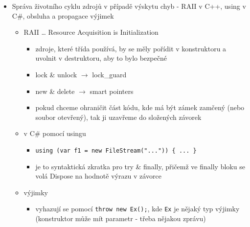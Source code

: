 \begin{itemize}
\begin{itemize}
\item můžou být statické
\begin{itemize}
\item např. \texttt{static \allowbreak{}x \allowbreak{}=\textgreater{}\allowbreak{} \allowbreak{}x \allowbreak{}+ \allowbreak{}1}
\end{itemize}
\item pokud nejsou statické, můžou zachytávat proměnné z kontextu (provádí se zachycení podobné capture by reference v C++)
\item lambda funkce jsou přiřaditelné do proměnných typu delegát
\end{itemize}
\item Správa životního cyklu zdrojů v případě výskytu chyb - RAII v C++, using v C\#, obsluha a propagace výjimek
\begin{itemize}
\item RAII \dots{} Resource Acquisition is Initialization
\begin{itemize}
\item zdroje, které třída používá, by se měly pořídit v konstruktoru a uvolnit v destruktoru, aby to bylo bezpečné
\item lock \& unlock $\to$ lock\_guard
\item new \& delete $\to$ smart pointers
\item pokud chceme ohraničit část kódu, kde má být zámek zamčený (nebo soubor otevřený), tak ji uzavřeme do složených závorek
\end{itemize}
\item v C\# pomocí usingu
\begin{itemize}
\item \texttt{using \allowbreak{}(\allowbreak{}var \allowbreak{}f1 \allowbreak{}= \allowbreak{}new \allowbreak{}FileStream(\allowbreak{}".\allowbreak{}.\allowbreak{}.\allowbreak{}")\allowbreak{})\allowbreak{} \allowbreak{}\{ \allowbreak{}.\allowbreak{}.\allowbreak{}.\allowbreak{} \allowbreak{}\}\allowbreak{}}
\item je to syntaktická zkratka pro try \& finally, přičemž ve finally bloku se volá Dispose na hodnotě výrazu v závorce
\end{itemize}
\item výjimky
\begin{itemize}
\item vyhazují se pomocí \texttt{throw \allowbreak{}new \allowbreak{}Ex(\allowbreak{})\allowbreak{};\allowbreak{}}, kde \texttt{Ex} je nějaký typ výjimky (konstruktor může mít parametr - třeba nějakou zprávu)

\end{itemize}
\end{itemize}
\end{itemize}
